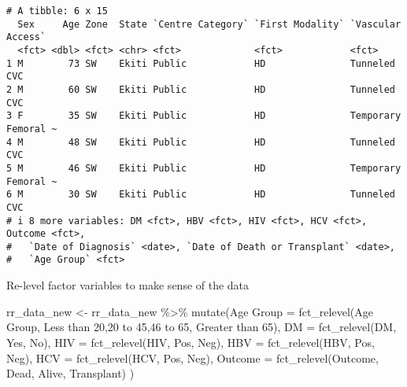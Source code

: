 \documentclass[
  letterpaper,
  DIV=11,
  numbers=noendperiod]{scrartcl}
\newenvironment{Shaded}{\begin{snugshade}}{\end{snugshade}}
\newcommand{\AttributeTok}[1]{\textcolor[rgb]{0.40,0.45,0.13}{#1}}
\newcommand{\FunctionTok}[1]{\textcolor[rgb]{0.28,0.35,0.67}{#1}}
\newcommand{\NormalTok}[1]{\textcolor[rgb]{0.00,0.23,0.31}{#1}}
\newcommand{\OtherTok}[1]{\textcolor[rgb]{0.00,0.23,0.31}{#1}}
\newcommand{\SpecialCharTok}[1]{\textcolor[rgb]{0.37,0.37,0.37}{#1}}
\newcommand{\StringTok}[1]{\textcolor[rgb]{0.13,0.47,0.30}{#1}}
\begin{document}
\begin{verbatim}
# A tibble: 6 x 15
  Sex     Age Zone  State `Centre Category` `First Modality` `Vascular Access`  
  <fct> <dbl> <fct> <chr> <fct>             <fct>            <fct>              
1 M        73 SW    Ekiti Public            HD               Tunneled CVC       
2 M        60 SW    Ekiti Public            HD               Tunneled CVC       
3 F        35 SW    Ekiti Public            HD               Temporary Femoral ~
4 M        48 SW    Ekiti Public            HD               Tunneled CVC       
5 M        46 SW    Ekiti Public            HD               Temporary Femoral ~
6 M        30 SW    Ekiti Public            HD               Tunneled CVC       
# i 8 more variables: DM <fct>, HBV <fct>, HIV <fct>, HCV <fct>, Outcome <fct>,
#   `Date of Diagnosis` <date>, `Date of Death or Transplant` <date>,
#   `Age Group` <fct>
\end{verbatim}

Re-level factor variables to make sense of the data

\begin{Shaded}
\begin{Highlighting}[]
\NormalTok{rr\_data\_new }\OtherTok{\textless{}{-}}\NormalTok{ rr\_data\_new }\SpecialCharTok{\%\textgreater{}\%} 
  \FunctionTok{mutate}\NormalTok{(}\StringTok{\textasciigrave{}}\AttributeTok{Age Group}\StringTok{\textasciigrave{}} \OtherTok{=} \FunctionTok{fct\_relevel}\NormalTok{(}\StringTok{\textasciigrave{}}\AttributeTok{Age Group}\StringTok{\textasciigrave{}}\NormalTok{, }\StringTok{\textquotesingle{}Less than 20\textquotesingle{}}\NormalTok{,}\StringTok{\textquotesingle{}20 to 45\textquotesingle{}}\NormalTok{,}\StringTok{\textquotesingle{}46 to 65\textquotesingle{}}\NormalTok{, }\StringTok{\textquotesingle{}Greater than 65\textquotesingle{}}\NormalTok{), }
         \AttributeTok{DM =} \FunctionTok{fct\_relevel}\NormalTok{(DM, }\StringTok{\textquotesingle{}Yes\textquotesingle{}}\NormalTok{, }\StringTok{\textquotesingle{}No\textquotesingle{}}\NormalTok{),}
         \AttributeTok{HIV =} \FunctionTok{fct\_relevel}\NormalTok{(HIV, }\StringTok{\textquotesingle{}Pos\textquotesingle{}}\NormalTok{, }\StringTok{\textquotesingle{}Neg\textquotesingle{}}\NormalTok{),}
         \AttributeTok{HBV =} \FunctionTok{fct\_relevel}\NormalTok{(HBV, }\StringTok{\textquotesingle{}Pos\textquotesingle{}}\NormalTok{, }\StringTok{\textquotesingle{}Neg\textquotesingle{}}\NormalTok{),}
         \AttributeTok{HCV =} \FunctionTok{fct\_relevel}\NormalTok{(HCV, }\StringTok{\textquotesingle{}Pos\textquotesingle{}}\NormalTok{, }\StringTok{\textquotesingle{}Neg\textquotesingle{}}\NormalTok{),}
         \AttributeTok{Outcome =} \FunctionTok{fct\_relevel}\NormalTok{(Outcome, }\StringTok{\textquotesingle{}Dead\textquotesingle{}}\NormalTok{, }\StringTok{\textquotesingle{}Alive\textquotesingle{}}\NormalTok{, }\StringTok{\textquotesingle{}Transplant\textquotesingle{}}\NormalTok{)}
\NormalTok{         )}
\end{Highlighting}
\end{Shaded}
\end{document}
